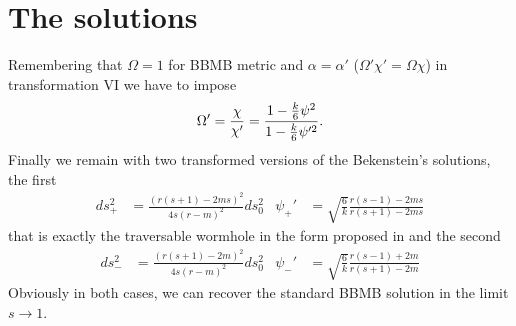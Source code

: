 \section{The solutions}
Remembering that $\Omega=1$ for BBMB metric and $\alpha=\alpha'$ ($\Omega'\chi'=\Omega\chi$) in transformation VI we have to impose 
\begin{equation}
   \Omega' = \frac{\chi}{\chi'} = \frac{1-\frac{k}{6}\psi^2}{1-\frac{k}{6}\psi'^2}.
   \notag
\end{equation}
Finally we remain with two transformed versions of the Bekenstein's solutions, the first 
\begin{align}
  ds^2_+ & = \frac{(r(s+1)- 2ms)^2}{4s(r-m)^2}ds_{0}^2 & \psi_+' &= \sqrt{\frac{6}{k}}\frac{r(s-1)- 2ms}{r(s+1)- 2ms}
  \label{wormhole metric +}
\end{align}
that is exactly the traversable wormhole in the form proposed in \citep{stationary} and the second
\begin{align}
  ds^2_- & = \frac{(r(s+1)- 2m)^2}{4s(r-m)^2}ds_{0}^2 & \psi_-' &= \sqrt{\frac{6}{k}}\frac{r(s-1)+ 2m}{r(s+1)- 2m}
  \label{wormhole metric -}
\end{align}
Obviously in both cases, we can recover the standard BBMB solution in the limit $s\rightarrow 1$.


